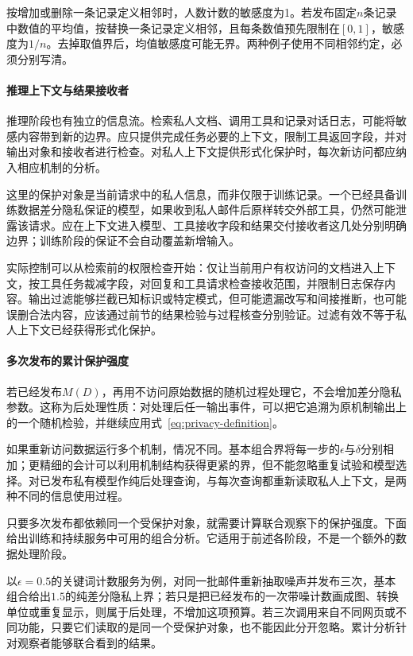 \begin{example}[计数与平均值的不同要求]
\label{ex:privacy-sensitivity}
按增加或删除一条记录定义相邻时，人数计数的敏感度为1。若发布固定$n$条记录中数值的平均值，按替换一条记录定义相邻，且每条数值预先限制在$[0,1]$，敏感度为$1/n$。去掉取值界后，均值敏感度可能无界。两种例子使用不同相邻约定，必须分别写清。
\end{example}

\paragraph{推理上下文与结果接收者}

推理阶段也有独立的信息流。检索私人文档、调用工具和记录对话日志，可能将敏感内容带到新的边界。应只提供完成任务必要的上下文，限制工具返回字段，并对输出对象和接收者进行检查。对私人上下文提供形式化保护时，每次新访问都应纳入相应机制的分析。

这里的保护对象是当前请求中的私人信息，而非仅限于训练记录。一个已经具备训练数据差分隐私保证的模型，如果收到私人邮件后原样转交外部工具，仍然可能泄露该请求。应在上下文进入模型、工具接收字段和结果交付接收者这几处分别明确边界；训练阶段的保证不会自动覆盖新增输入。

实际控制可以从检索前的权限检查开始：仅让当前用户有权访问的文档进入上下文，按工具任务裁减字段，对回复和工具请求检查接收范围，并限制日志保存内容。输出过滤能够拦截已知标识或特定模式，但可能遗漏改写和间接推断，也可能误删合法内容，应该通过前节的结果检验与过程核查分别验证。过滤有效不等于私人上下文已经获得形式化保护。

\paragraph{多次发布的累计保护强度}

若已经发布$M(D)$，再用不访问原始数据的随机过程处理它，不会增加差分隐私参数。这称为后处理性质：对处理后任一输出事件，可以把它追溯为原机制输出上的一个随机检验，并继续应用式~\eqref{eq:privacy-definition}。

如果重新访问数据运行多个机制，情况不同。基本组合界将每一步的$\epsilon$与$\delta$分别相加；更精细的会计可以利用机制结构获得更紧的界，但不能忽略重复试验和模型选择。对已发布私有模型作纯后处理查询，与每次查询都重新读取私人上下文，是两种不同的信息使用过程。

只要多次发布都依赖同一个受保护对象，就需要计算联合观察下的保护强度。下面给出训练和持续服务中可用的组合分析。它适用于前述各阶段，不是一个额外的数据处理阶段。

以$\epsilon=0.5$的关键词计数服务为例，对同一批邮件重新抽取噪声并发布三次，基本组合给出$1.5$的纯差分隐私上界；若只是把已经发布的一次带噪计数画成图、转换单位或重复显示，则属于后处理，不增加这项预算。若三次调用来自不同网页或不同功能，只要它们读取的是同一个受保护对象，也不能因此分开忽略。累计分析针对观察者能够联合看到的结果。

